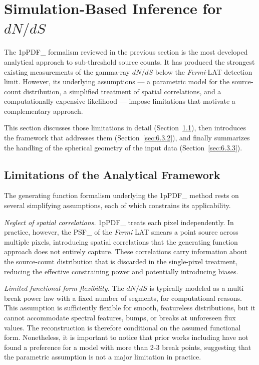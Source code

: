 \section{Simulation-Based Inference for $dN/dS$}
\label{sec:sbi_cnn}

The \gls{1pPDF_} formalism reviewed in the previous section is the most developed analytical approach to sub-threshold source counts.
It has produced the strongest existing measurements of the gamma-ray $dN/dS$ below the \textit{Fermi}-LAT detection limit.
However, its underlying assumptions --- a parametric model for the source-count distribution, a simplified treatment of spatial correlations, and a computationally expensive likelihood --- impose limitations that motivate a complementary approach.

This section discusses those limitations in detail (Section~\ref{sec:6.3.1}), then introduces the \SBI framework that addresses them (Section~\ref{sec:6.3.2}), and finally summarizes the handling of the spherical geometry of the input data (Section~\ref{sec:6.3.3}).

\subsection{Limitations of the Analytical Framework}
\label{sec:6.3.1}

The generating function formalism underlying the \gls{1pPDF_} method rests on several simplifying assumptions, each of which constrains its applicability.

\textit{Neglect of spatial correlations.}
\Gls{1pPDF_} treats each pixel independently.
In practice, however, the \gls{PSF_} of the \textit{Fermi} LAT smears a point source across multiple pixels, introducing spatial correlations that the generating function approach does not entirely capture.
These correlations carry information about the source-count distribution that is discarded in the single-pixel treatment, reducing the effective constraining power and potentially introducing biases.

\textit{Limited functional form flexibility.}
The $dN/dS$ is typically modeled as a multi break power law with a fixed number of segments, for computational reasons.
This assumption is sufficiently flexible for smooth, featureless distributions, but it cannot accommodate spectral features, bumps, or breaks at unforeseen flux values.
The reconstruction is therefore conditional on the assumed functional form.
Nonetheless, it is important to notice that prior works including \cite{Zechlin:2016pme} have not found a preference for a model with more than 2-3 break points, suggesting that the parametric assumption is not a major limitation in practice.

